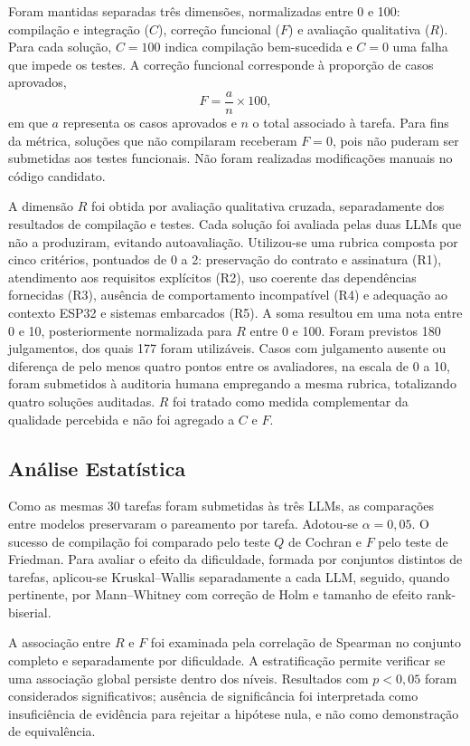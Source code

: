 \documentclass[12pt]{article}
\begin{document}
Foram mantidas separadas três dimensões, normalizadas entre 0 e 100: compilação e integração ($C$), correção funcional ($F$) e avaliação qualitativa ($R$). Para cada solução, $C=100$ indica compilação bem-sucedida e $C=0$ uma falha que impede os testes. A correção funcional corresponde à proporção de casos aprovados,
\begin{equation}
F = \frac{a}{n} \times 100,
\label{eq:funcional}
\end{equation}
em que $a$ representa os casos aprovados e $n$ o total associado à tarefa. Para fins da métrica, soluções que não compilaram receberam $F=0$, pois não puderam ser submetidas aos testes funcionais. Não foram realizadas modificações manuais no código candidato.

A dimensão $R$ foi obtida por avaliação qualitativa cruzada, separadamente dos resultados de compilação e testes. Cada solução foi avaliada pelas duas LLMs que não a produziram, evitando autoavaliação. Utilizou-se uma rubrica composta por cinco critérios, pontuados de 0 a 2: preservação do contrato e assinatura (R1), atendimento aos requisitos explícitos (R2), uso coerente das dependências fornecidas (R3), ausência de comportamento incompatível (R4) e adequação ao contexto ESP32 e sistemas embarcados (R5). A soma resultou em uma nota entre 0 e 10, posteriormente normalizada para $R$ entre 0 e 100. Foram previstos 180 julgamentos, dos quais 177 foram utilizáveis. Casos com julgamento ausente ou diferença de pelo menos quatro pontos entre os avaliadores, na escala de 0 a 10, foram submetidos à auditoria humana empregando a mesma rubrica, totalizando quatro soluções auditadas. $R$ foi tratado como medida complementar da qualidade percebida e não foi agregado a $C$ e $F$.

\subsection{Análise Estatística}
\label{sec:estatistica}

Como as mesmas 30 tarefas foram submetidas às três LLMs, as comparações entre modelos preservaram o pareamento por tarefa. Adotou-se $\alpha=0{,}05$. O sucesso de compilação foi comparado pelo teste $Q$ de Cochran e $F$ pelo teste de Friedman. Para avaliar o efeito da dificuldade, formada por conjuntos distintos de tarefas, aplicou-se Kruskal--Wallis separadamente a cada LLM, seguido, quando pertinente, por Mann--Whitney com correção de Holm e tamanho de efeito rank-biserial.

A associação entre $R$ e $F$ foi examinada pela correlação de Spearman no conjunto completo e separadamente por dificuldade. A estratificação permite verificar se uma associação global persiste dentro dos níveis. Resultados com $p<0{,}05$ foram considerados significativos; ausência de significância foi interpretada como insuficiência de evidência para rejeitar a hipótese nula, e não como demonstração de equivalência.
\end{document}
